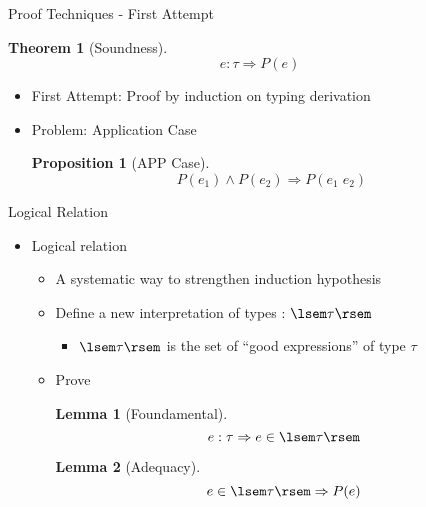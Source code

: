 \documentclass{beamer}
\newtheorem{thm}{Theorem}
\newtheorem{lem}{Lemma}
\newtheorem{prop}{Proposition}
\begin{document}
\begin{frame}{Proof Techniques - First Attempt}

  \begin{thm}[Soundness]
    $$
     e:\tau \Rightarrow P(e)
    $$
  \end{thm}

  \begin{itemize}
  \item First Attempt: Proof by induction on typing derivation
  \item Problem: Application Case
  \begin{prop}[APP Case]
    $$
    P(e_1) \wedge P(e_2) \Rightarrow P(e_1\;e_2)
    $$
  \end{prop}
  \end{itemize}

\end{frame}


\begin{frame}{Logical Relation}

\begin{itemize}
\item Logical relation
  \begin{itemize}
  \item A systematic way to strengthen induction hypothesis
  \item Define a new interpretation of types : $\lsem\tau\rsem$
    \begin{itemize}
    \item $\lsem\tau\rsem$ is the set of ``good expressions'' of type $\tau$
    \end{itemize}
    
  \item Prove 
    \begin{lem}[Foundamental]
      $$
       e:\tau \Rightarrow e\in\lsem\tau\rsem
      $$
    \end{lem}

    \begin{lem}[Adequacy]
      $$
      e\in\lsem\tau\rsem \Rightarrow P(e)
      $$
    \end{lem}
  \end{itemize}
\end{itemize}

\end{frame}
\end{document}
